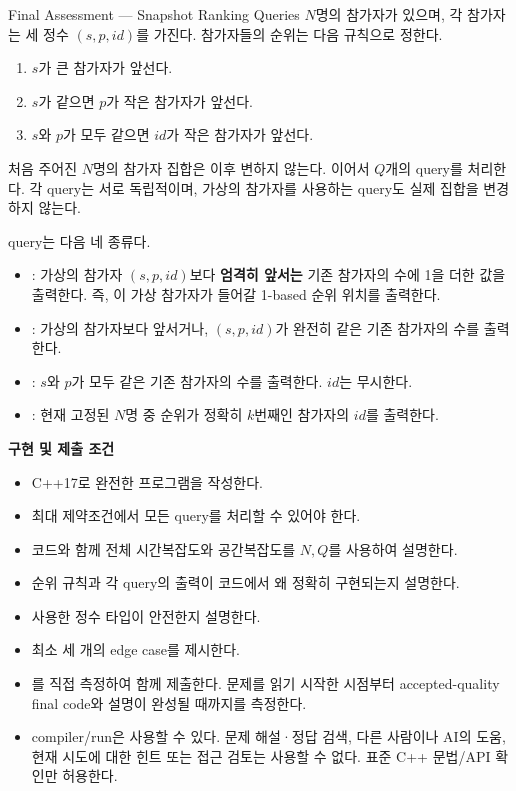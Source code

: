 \begin{problembox}{Final Assessment --- Snapshot Ranking Queries}
$N$명의 참가자가 있으며, 각 참가자는 세 정수 $(s,p,id)$를 가진다. 참가자들의 순위는 다음 규칙으로 정한다.
\begin{enumerate}
\item $s$가 큰 참가자가 앞선다.
\item $s$가 같으면 $p$가 작은 참가자가 앞선다.
\item $s$와 $p$가 모두 같으면 $id$가 작은 참가자가 앞선다.
\end{enumerate}
처음 주어진 $N$명의 참가자 집합은 이후 변하지 않는다. 이어서 $Q$개의 query를 처리한다. 각 query는 서로 독립적이며, 가상의 참가자를 사용하는 query도 실제 집합을 변경하지 않는다.

query는 다음 네 종류다.
\begin{itemize}
\item {}: 가상의 참가자 $(s,p,id)$보다 \textbf{엄격히 앞서는} 기존 참가자의 수에 1을 더한 값을 출력한다. 즉, 이 가상 참가자가 들어갈 1-based 순위 위치를 출력한다.
\item {}: 가상의 참가자보다 앞서거나, $(s,p,id)$가 완전히 같은 기존 참가자의 수를 출력한다.
\item {}: $s$와 $p$가 모두 같은 기존 참가자의 수를 출력한다. $id$는 무시한다.
\item {}: 현재 고정된 $N$명 중 순위가 정확히 $k$번째인 참가자의 $id$를 출력한다.
\end{itemize}

\textbf{구현 및 제출 조건}
\begin{itemize}
\item C++17로 완전한 프로그램을 작성한다.
\item 최대 제약조건에서 모든 query를 처리할 수 있어야 한다.
\item 코드와 함께 전체 시간복잡도와 공간복잡도를 $N,Q$를 사용하여 설명한다.
\item 순위 규칙과 각 query의 출력이 코드에서 왜 정확히 구현되는지 설명한다.
\item 사용한 정수 타입이 안전한지 설명한다.
\item 최소 세 개의 edge case를 제시한다.
\item {}를 직접 측정하여 함께 제출한다. 문제를 읽기 시작한 시점부터 accepted-quality final code와 설명이 완성될 때까지를 측정한다.
\item compiler/run은 사용할 수 있다. 문제 해설·정답 검색, 다른 사람이나 AI의 도움, 현재 시도에 대한 힌트 또는 접근 검토는 사용할 수 없다. 표준 C++ 문법/API 확인만 허용한다.
\end{itemize}


\end{problembox}
